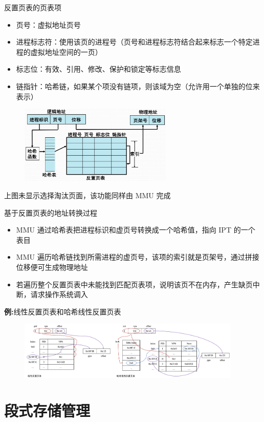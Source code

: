 \documentclass[cs4size,a4paper,10pt]{ctexart}
\begin{document}
		反置页表的页表项
		\begin{itemize}
			\item 页号：虚拟地址页号
			\item 进程标志符：使用该页的进程号（页号和进程标志符结合起来标志一个特定进程的虚拟地址空间的一页）
			\item 标志位：有效、引用、修改、保护和锁定等标志信息
			\item 链指针：哈希链，如果某个项没有链项，则该域为空（允许用一个单独的位来表示）
		\end{itemize}
		\begin{figure}[H]
			\centering
			\includegraphics[width=0.65\textwidth]{img/3.3.6}
		\end{figure}
		上图未显示选择淘汰页面，该功能同样由 MMU 完成

		基于反置页表的地址转换过程
		\begin{itemize}
			\item MMU 通过哈希表把进程标识和虚页号转换成一个哈希值，指向 IPT 的一个表目
			\item MMU 遍历哈希链找到所需进程的虚页号，该项的索引就是页架号，通过拼接位移便可生成物理地址
			\item 若遍历整个反置页表中未能找到匹配页表项，说明该页不在内存，产生缺页中断，请求操作系统调入
		\end{itemize}

		\textbf{例:}线性反置页表和哈希线性反置页表
		\begin{figure}[H]
			\centering
			\includegraphics[width=0.95\textwidth]{img/3.3.6.1}
		\end{figure}


		\section{段式存储管理}
\end{document}
